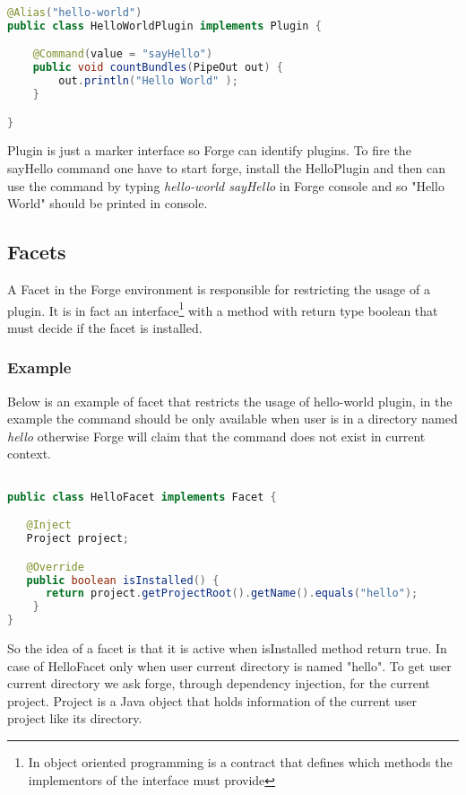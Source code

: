 \begin{lstlisting}[language=java,label=forge-plugin,caption=Forge plugin example]
@Alias("hello-world")
public class HelloWorldPlugin implements Plugin {

    @Command(value = "sayHello")
    public void countBundles(PipeOut out) {
        out.println("Hello World" );
    }

}
\end{lstlisting}

Plugin is just a marker interface so Forge can identify plugins. To fire the sayHello command one have to start forge, install the HelloPlugin and then can use the command by typing \emph{hello-world sayHello} in Forge console and so "Hello World" should be printed in console.

\subsection{Facets}
\label{sec:forge:facet}
A Facet in the Forge environment is responsible for restricting the usage of a plugin. It is in fact an interface\footnote{In object oriented programming is a contract that defines which methods the implementors of the interface must provide} with a method with return type boolean that must decide if the facet is installed.

\subsubsection{Example}
Below is an example of facet that restricts the usage of hello-world plugin, in the example the command should be only available when user is in a directory named \emph{hello} otherwise Forge will claim that the command does not exist in current context.

\begin{lstlisting}[language=java,label=hello-facet,caption=Forge facet example]

public class HelloFacet implements Facet {

   @Inject 
   Project project;

   @Override
   public boolean isInstalled() {
      return project.getProjectRoot().getName().equals("hello");
    }
}
\end{lstlisting}

So the idea of a facet is that it is active when isInstalled method return true. In case of HelloFacet only when user current directory is
named "hello". To get user current directory we ask forge, through dependency injection, for the current project. Project is a Java object that holds information of the current user project like its directory. 

